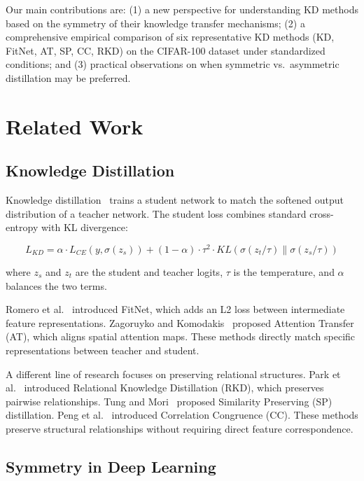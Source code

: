 \documentclass[symmetry,article,submit,pdftex,moreauthors]{Definitions/mdpi}
\begin{document}
Our main contributions are: (1) a new perspective for understanding KD methods based on the symmetry of their knowledge transfer mechanisms; (2) a comprehensive empirical comparison of six representative KD methods (KD, FitNet, AT, SP, CC, RKD) on the CIFAR-100 dataset under standardized conditions; and (3) practical observations on when symmetric vs.~asymmetric distillation may be preferred.

\section{Related Work}

\subsection{Knowledge Distillation}

Knowledge distillation~\cite{ref7} trains a student network to match the softened output distribution of a teacher network. The student loss combines standard cross-entropy with KL divergence:

\begin{equation}
L_{KD} = \alpha \cdot L_{CE}(y, \sigma(z_s)) + (1-\alpha) \cdot \tau^2 \cdot KL(\sigma(z_t/\tau) \parallel \sigma(z_s/\tau))
\end{equation}

where $z_s$ and $z_t$ are the student and teacher logits, $\tau$ is the temperature, and $\alpha$ balances the two terms.

Romero et al.~\cite{ref8} introduced FitNet, which adds an L2 loss between intermediate feature representations. Zagoruyko and Komodakis~\cite{ref9} proposed Attention Transfer (AT), which aligns spatial attention maps. These methods directly match specific representations between teacher and student.

A different line of research focuses on preserving relational structures. Park et al.~\cite{ref12} introduced Relational Knowledge Distillation (RKD), which preserves pairwise relationships. Tung and Mori~\cite{ref10} proposed Similarity Preserving (SP) distillation. Peng et al.~\cite{ref11} introduced Correlation Congruence (CC). These methods preserve structural relationships without requiring direct feature correspondence.

\subsection{Symmetry in Deep Learning}
\end{document}
